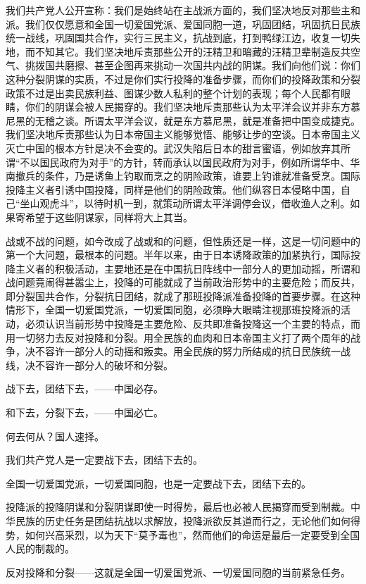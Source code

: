 我们共产党人公开宣称：我们是始终站在主战派方面的，我们坚决地反对那些主和派。我们仅仅愿意和全国一切爱国党派、爱国同胞一道，巩固团结，巩固抗日民族统一战线，巩固国共合作，实行三民主义，抗战到底，打到鸭绿江边，收复一切失地，而不知其它。我们坚决地斥责那些公开的汪精卫和暗藏的汪精卫辈制造反共空气、挑拨国共磨擦、甚至企图再来挑动一次国共内战的阴谋。我们向他们说：你们这种分裂阴谋的实质，不过是你们实行投降的准备步骤，而你们的投降政策和分裂政策不过是出卖民族利益、图谋少数人私利的整个计划的表现；每个人民都有眼睛，你们的阴谋会被人民揭穿的。我们坚决地斥责那些认为太平洋会议并非东方慕尼黑的无稽之谈。所谓太平洋会议，就是东方慕尼黑，就是准备把中国变成捷克。我们坚决地斥责那些认为日本帝国主义能够觉悟、能够让步的空谈。日本帝国主义灭亡中国的根本方针是决不会变的。武汉失陷后日本的甜言蜜语，例如放弃其所谓“不以国民政府为对手”的方针，转而承认以国民政府为对手，例如所谓华中、华南撤兵的条件，乃是诱鱼上钓取而烹之的阴险政策，谁要上钓谁就准备受烹。国际投降主义者引诱中国投降，同样是他们的阴险政策。他们纵容日本侵略中国，自己“坐山观虎斗”，以待时机一到，就策动所谓太平洋调停会议，借收渔人之利。如果寄希望于这些阴谋家，同样将大上其当。

战或不战的问题，如今改成了战或和的问题，但性质还是一样，这是一切问题中的第一个大问题，最根本的问题。半年以来，由于日本诱降政策的加紧执行，国际投降主义者的积极活动，主要地还是在中国抗日阵线中一部分人的更加动摇，所谓和战问题竟闹得甚嚣尘上，投降的可能就成了当前政治形势中的主要危险；而反共，即分裂国共合作，分裂抗日团结，就成了那班投降派准备投降的首要步骤。在这种情形下，全国一切爱国党派，一切爱国同胞，必须睁大眼睛注视那班投降派的活动，必须认识当前形势中投降是主要危险、反共即准备投降这一个主要的特点，而用一切努力去反对投降和分裂。用全民族的血肉和日本帝国主义打了两个周年的战争，决不容许一部分人的动摇和叛卖。用全民族的努力所结成的抗日民族统一战线，决不容许一部分人的破坏和分裂。

战下去，团结下去，——中国必存。

和下去，分裂下去，——中国必亡。

何去何从？国人速择。

我们共产党人是一定要战下去，团结下去的。

全国一切爱国党派，一切爱国同胞，也是一定要战下去，团结下去的。

投降派的投降阴谋和分裂阴谋即使一时得势，最后也必被人民揭穿而受到制裁。中华民族的历史任务是团结抗战以求解放，投降派欲反其道而行之，无论他们如何得势，如何兴高采烈，以为天下“莫予毒也”，然而他们的命运是最后一定要受到全国人民的制裁的。

反对投降和分裂——这就是全国一切爱国党派、一切爱国同胞的当前紧急任务。

